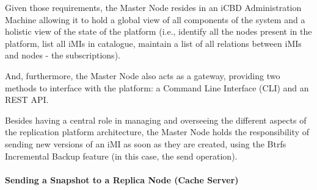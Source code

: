 Given those requirements, the Master Node resides in an iCBD Administration Machine allowing it to hold a global view of all components of the system and a holistic view of the state of the platform (i.e., identify all the nodes present in the platform, list all iMIs in catalogue, maintain a list of all relations between iMIs and nodes - the subscriptions).

And, furthermore, the Master Node also acts as a gateway, providing two methods to interface with the platform: a Command Line Interface (CLI) and an REST API.

Besides having a central role in managing and overseeing the different aspects of the replication platform architecture, the Master Node holds the responsibility of sending new versions of an iMI as soon as they are created, using the Btrfs Incremental Backup feature (in this case, the send operation).

\paragraph{Sending a Snapshot to a Replica Node (Cache Server)}
\label{par:impl_sendsnap}





